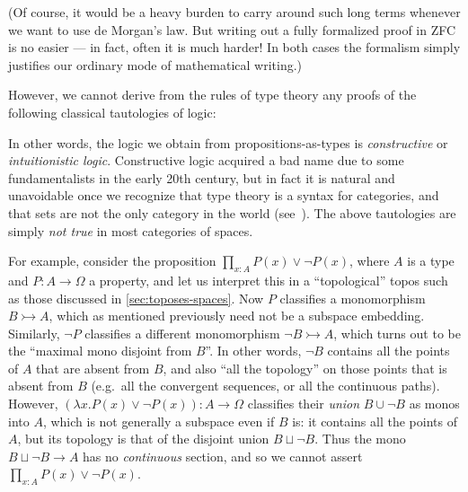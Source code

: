 \documentclass[10pt]{article}
\numberwithin{equation}{section}
\begin{document}
(Of course, it would be a heavy burden to carry around such long terms whenever we want to use de Morgan's law.
But writing out a fully formalized proof in ZFC is no easier --- in fact, often it is much harder!
In both cases the formalism simply justifies our ordinary mode of mathematical writing.)

However, we cannot derive from the rules of type theory any proofs of the following classical tautologies of logic:
In other words, the logic we obtain from propositions-as-types is \emph{constructive} or \emph{intuitionistic logic}.
Constructive logic acquired a bad name due to some fundamentalists in the early 20th century, but in fact it is natural and unavoidable once we recognize that type theory is a syntax for categories, and that sets are not the only category in the world (see~\cite{bauer:5stages}).
The above tautologies are simply \emph{not true} in most categories of spaces. %

For example, consider the proposition $\prod_{x:A} P(x) \lor \neg P(x)$, where $A$ is a type and $P:A\to\Omega$ a property, and let us interpret this in a ``topological'' topos such as those discussed in \cref{sec:toposes-spaces}.
Now $P$ classifies a monomorphism $B\rightarrowtail A$, which as mentioned previously need not be a subspace embedding.
Similarly, $\neg P$ classifies a different monomorphism $\neg B\rightarrowtail A$, which turns out to be the ``maximal mono disjoint from $B$''.
In other words, $\neg B$ contains all the points of $A$ that are absent from $B$, and also ``all the topology'' on those points that is absent from $B$ (e.g.\ all the convergent sequences, or all the continuous paths).
However, $(\lambda x. P(x)\lor \neg P(x)) : A \to \Omega$ classifies their \emph{union} $B\cup \neg B$ as monos into $A$, which is not generally a subspace even if $B$ is: it contains all the points of $A$, but its topology is that of the disjoint union $B \sqcup \neg B$.
Thus the mono $B\sqcup \neg B \to A$ has no \emph{continuous} section, and so we cannot assert $\prod_{x:A} P(x) \lor \neg P(x)$.
\end{document}
